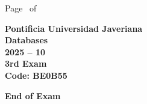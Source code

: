 \documentclass[11pt, addpoints]{exam}\usepackage[utf8]{inputenc}
\begin{document}
\begin{coverpages}
\begin{center}
			\vspace{3mm}
			\leavevmode \hspace{5mm} 
		\end{center}
	\end{coverpages}

	\footer{} {Page \thepage\ of \numpages} {}

	\centering
	\textbf{\Large Pontificia Universidad Javeriana}\\
	\textbf{\Large Databases} \\
	\textbf{\large 2025 -- 10} \\
	\textbf{\large 3rd Exam} \\
	\textbf{Code: BE0B55}


	\begin{questions}
		
		
		
		
		
		
		
		
		
		
		
		
		
		
		
		
		
		
		
		
	\end{questions}

	\vspace{5mm}
	\noindent \textbf{End of Exam}
\end{document}
